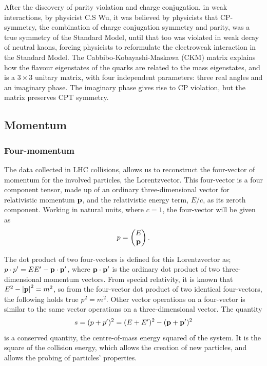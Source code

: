 \documentclass[12pt,a4paper]{article}
\numberwithin{equation}{section}
\begin{document}
After the discovery of parity violation and charge conjugation, in weak
interactions, by physicist C.S Wu\cite{PhysRev.105.1413}, it was believed by
physicists that CP-symmetry, the combination of charge conjugation symmetry and
parity, was a true symmetry of the Standard Model, until that too was violated
in weak decay of neutral kaons, forcing physicists to reformulate the
electroweak interaction in the Standard Model. The Cabbibo-Kobayashi-Maskawa
(CKM) matrix explains how the flavour eigenstates of the quarks are related to
the mass eigenstates, and is a $3 \times 3$ unitary matrix, with four independent
parameters: three real angles and an imaginary phase\cite[153]{Povh2015}. The
imaginary phase gives rise to CP violation, but the matrix preserves CPT
symmetry.

\subsection{Momentum}\label{sec:momentum}

\subsubsection{Four-momentum}
The data collected in LHC collisions, allows us to reconstruct the four-vector
of momentum for the involved particles, the Lorentzvector. This four-vector is a
four component tensor, made up of an ordinary three-dimensional vector for
relativistic momentum $\vb p$, and the relativistic energy term, $E/c$, as its
zeroth component. Working in natural units, where $c=1$, the four-vector will be
given as
\begin{equation}
p = \left(\begin{matrix} E \\ \vb p \end{matrix} \right).
\end{equation}

The dot product of two four-vectors is defined for this Lorentzvector as;
$p\cdot p' = E E' - \vb p \cdot \vb{p'}$, where $\vb p \cdot \vb{p'}$ is the ordinary dot
product of two three-dimensional momentum vectors. From special relativity, it is known
that $E^2 - \abs{\vb p}^2 = m^2$, so from the four-vector dot product of two
identical four-vectors, the following holds true $p^2 = m^2$. Other vector
operations on a four-vector is similar to the same vector operations on a
three-dimensional vector. The quantity
\begin{equation}
s = (p + p')^2 = (E + E')^2 - (\vb p + \vb p')^2
\end{equation}
is a conserved quantity, the centre-of-mass energy squared of the system. It is
the square of the collision energy, which allows the creation of new particles,
and allows the probing of particles' properties.
\end{document}
